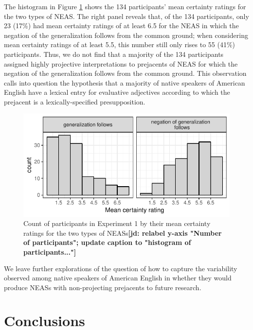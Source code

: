 \documentclass[11pt,fleqn]{article}
\newcommand{\6}{\mbox{$[\hspace*{-.6mm}[$}}
\newcommand{\9}{\mbox{$]\hspace*{-.6mm}]$}}
\newcommand{\jd}[1]{\textbf{\color{red}[jd: #1]}}
\begin{document}
The histogram in Figure \ref{f-dialect} shows the 134 participants' mean certainty ratings for the two types of NEAS. The right panel reveals that, of the 134 participants, only 23 (17\%) had mean certainty ratings of at least 6.5 for the NEAS in which the negation of the generalization follows from the common ground; when considering mean certainty ratings of at least 5.5, this number still only rises to 55 (41\%) participants. Thus, we do not find that a majority of the 134 participants assigned highly projective interpretations to prejacents of NEAS for which the negation of the generalization follows from the common ground. This observation calls into question the hypothesis that a majority of native speakers of American English have a lexical entry for evaluative adjectives according to which the prejacent is a lexically-specified presupposition. 


\begin{figure}[h!]
\begin{center}
\includegraphics[scale=.9]{../exp2-projection/graphs/count-of-participants}

\caption{Count of participants in Experiment 1 by their mean certainty ratings for the two types of NEASs\jd{relabel y-axis "Number of participants"; update caption to "histogram of participants..."}}\label{f-dialect}
\end{center}
\end{figure}

We leave further explorations of the question of how to capture the variability observed among native speakers of American English in whether they would produce NEASs with non-projecting prejacents to future research.

\section{Conclusions}\label{s6}
\end{document}

